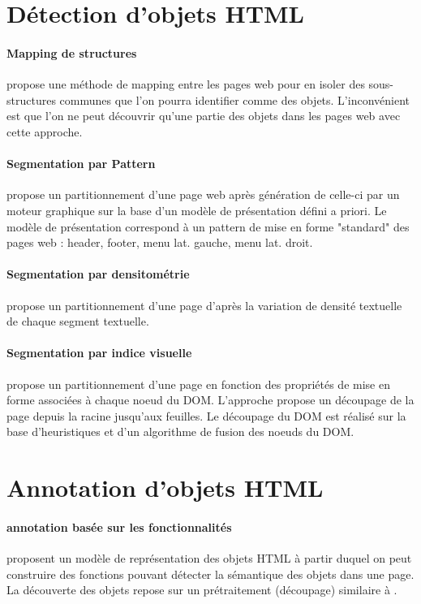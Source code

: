 \documentclass[10pt,a4paper]{article}
\author{Franck Petitdemange}
\begin{document}
\section{Détection d'objets HTML}
\paragraph*{Mapping de structures} \cite{vieira2006fast} propose une méthode de mapping entre les pages web pour en isoler des sous-structures communes que l'on pourra identifier comme des objets. L'inconvénient est que l'on ne peut découvrir qu'une partie des objets dans les pages web avec cette approche. 

\paragraph*{Segmentation par Pattern} \cite{kovacevic2002recognition} propose un partitionnement d'une page web après génération de celle-ci par un moteur graphique sur la base d'un modèle de présentation défini a priori. Le modèle de présentation correspond à un pattern de mise en forme "standard" des pages web : header, footer, menu lat. gauche, menu lat. droit. 

\paragraph*{Segmentation par densitométrie} \cite{kohlschutter2008densitometric} propose un partitionnement d'une page d'après la variation de densité textuelle de chaque segment textuelle.

\paragraph*{Segmentation par indice visuelle} \cite{cai2003extracting} propose un partitionnement d'une page en fonction des propriétés de mise en forme associées à chaque noeud du DOM. L'approche propose un découpage de la page depuis la racine jusqu'aux feuilles. Le découpage du DOM est réalisé sur la base d'heuristiques et d'un algorithme de fusion des noeuds du DOM.

\section{Annotation d'objets HTML} 

\paragraph*{annotation basée sur les fonctionnalités} \cite{chen2001function} proposent un modèle de représentation des objets HTML à partir duquel on peut construire des fonctions pouvant détecter la sémantique des objets dans une page. La découverte des objets repose sur un prétraitement (découpage) similaire à \cite{cai2003extracting}.
\end{document}
